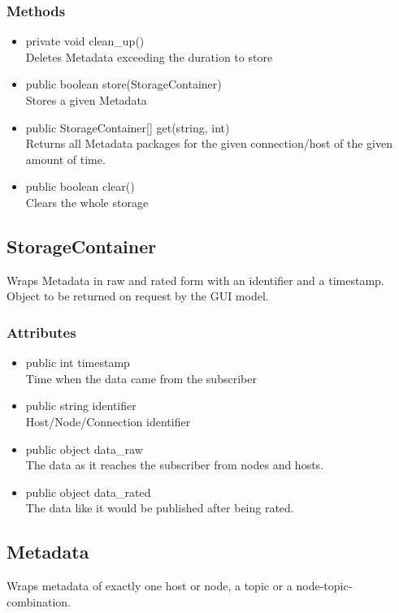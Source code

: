\subsubsection{Methods}
\begin{itemize}
	\item private void clean\_up()\\
	Deletes Metadata exceeding the duration to store
	\item public boolean store(StorageContainer)\\
	Stores a given Metadata
	\item public StorageContainer[] get(string, int)\\
	Returns all Metadata packages for the given connection/host of the given amount of time.
	\item public boolean clear()\\
	Clears the whole storage
\end{itemize}


\subsection{StorageContainer}
Wraps Metadata in raw and rated form with an identifier and a timestamp. Object to be returned on request by the GUI model.

\subsubsection{Attributes}
\begin{itemize}
	\item public int timestamp\\
	Time when the data came from the subscriber
	\item public string identifier\\
	Host/Node/Connection identifier
	\item public object data\_raw\\
	The data as it reaches the subscriber from nodes and hosts.
	\item public object data\_rated\\
	The data like it would be published after being rated.
\end{itemize}


\subsection{Metadata}
Wraps metadata of exactly one host or node, a topic or a node-topic-combination.


